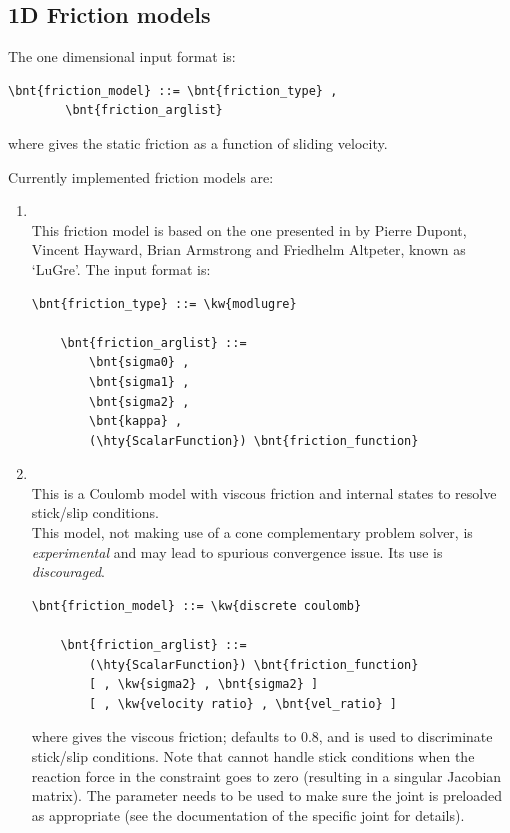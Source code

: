 \subsection{1D Friction models}
\label{sec:friction model 1D}
The one dimensional  input format is:
\begin{Verbatim}[commandchars=\\\{\}]
    \bnt{friction_model} ::= \bnt{friction_type} ,
        \bnt{friction_arglist}
\end{Verbatim}
where  gives the static friction
as a function of sliding velocity.

Currently implemented friction models are:
\begin{enumerate}
\item {}\\
This friction model is based on the one presented in \cite{LUGRE-2002}
by Pierre Dupont, Vincent Hayward, Brian Armstrong and Friedhelm Altpeter,
known as `LuGre'.
The input format is:
\begin{Verbatim}[commandchars=\\\{\}]
    \bnt{friction_type} ::= \kw{modlugre}

    \bnt{friction_arglist} ::=
        \bnt{sigma0} ,
        \bnt{sigma1} ,
        \bnt{sigma2} ,
        \bnt{kappa} ,
        (\hty{ScalarFunction}) \bnt{friction_function}
\end{Verbatim}

    \item {}\\
    This is a Coulomb model with viscous friction and
    internal states to resolve stick/slip conditions.\\
    This model, not making use of a cone complementary problem solver,
    is \emph{experimental} and may lead to spurious convergence issue. Its use is \emph{discouraged}.
\begin{Verbatim}[commandchars=\\\{\}]
    \bnt{friction_model} ::= \kw{discrete coulomb}

    \bnt{friction_arglist} ::=
        (\hty{ScalarFunction}) \bnt{friction_function}
        [ , \kw{sigma2} , \bnt{sigma2} ]
        [ , \kw{velocity ratio} , \bnt{vel_ratio} ]
\end{Verbatim}
    where  gives the viscous friction;
     defaults to 0.8, and is used
    to discriminate stick/slip conditions.
    Note that 
    cannot handle stick conditions when the reaction force
    in the constraint goes to zero (resulting in a singular Jacobian matrix).
    The  parameter needs to be used to make sure
    the joint is preloaded as appropriate
    (see the documentation of the specific joint for details).
\end{enumerate}

